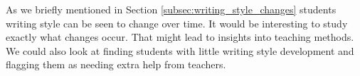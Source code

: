 As we briefly mentioned in Section \ref{subsec:writing_style_changes} students
writing style can be seen to change over time. It would be interesting to study
exactly what changes occur. That might lead to insights into teaching methods.
We could also look at finding students with little writing style development and
flagging them as needing extra help from teachers.
